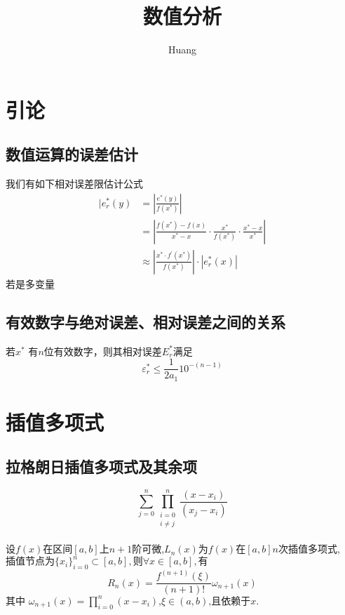 \documentclass[lang=cn,14pt]{elegantbook}
\title{数值分析}
\author{ Huang}
\begin{document}
	
	\maketitle
	\frontmatter
	
	\tableofcontents
	
	\mainmatter
	\chapter{引论}
	\section{数值运算的误差估计}
	我们有如下相对误差限估计公式
	\begin{equation*}
		\begin{aligned}
			|e_r^*(y)& =\left|\frac{e^*(y)}{f(x^*)}\right|  \\
			&=\left|\frac{f(x^{*})-f(x)}{x^{*}-x}\cdot\frac{x^{*}}{f(x^{*})}\cdot\frac{x^{*}-x}{x^{*}}\right| \\
			&\approx\left|\frac{x^*\cdot f^{\prime}(x^*)}{f(x^*)}\right|\cdot\left|e_r^*(x)\right|
		\end{aligned}
	\end{equation*}
	若是多变量
	\section{有效数字与绝对误差、相对误差之间的关系}
		\begin{theorem}
		若$x^{*}$ 有$n$位有效数字，则其相对误差$E_{r}^{*}$满足
		\begin{equation*}
			\varepsilon_{r}^{*}\leq\frac{1}{2a_{1}}10^{-(n-1)}
		\end{equation*}
	\end{theorem}
	\chapter{插值多项式}
	\section{拉格朗日插值多项式及其余项}
	\begin{definition}[拉格朗日插值多项式]
			\begin{equation*}
			\sum_{j=0}^n{\prod_{\begin{array}{c}
						i=0\\
						i\ne j\\
				\end{array}}^n{\frac{(x-x_i)}{(x_j-x_i)}}}
		\end{equation*}
	\end{definition}
	\begin{theorem}[误差余项]
			 设$f(x)$在区间$[a,b]$上$n+1$阶可微,$L_n(x)$为$f(x)$在$[a,b]$$n$次插值多项式,$\text{插值节点为}\{x_i\}_{i=0}^n\subset[a,b],\text{则}\forall x\in[a,b],\text{有}$ 
			 \begin{equation*}
			 		R_n(x)=\frac{f^{(n+1)}(\xi)}{(n+1)!}\omega_{n+1}(x) 
			 \end{equation*}
		$	\text{其中 }\omega_{n+1}(x)=\prod_{i=0}^n(x-x_i)\text{,}\xi\in(a,b)\text{,且依赖于}x. $
	\end{theorem}
\end{document}
